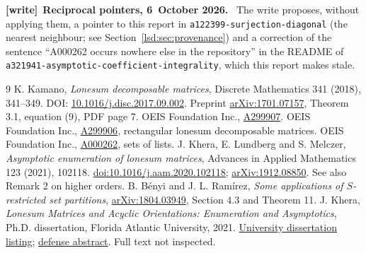\documentclass[11pt]{article}
\theoremstyle{remark}\newtheorem{remark}{Remark}
\newcommand{\file}[1]{\nolinkurl{#1}}
\newenvironment{writenote}[1][]{\par\smallskip\begingroup\small
 \noindent\textbf{[write]}\if\relax\detokenize{#1}\relax\else~\textbf{#1.}\fi\ }%
 {\par\endgroup\smallskip}
\begin{document}
\begin{writenote}[Reciprocal pointers, 6~October 2026]
The write proposes, without applying them, a pointer to this report in
\file{a122399-surjection-diagonal} (the nearest neighbour; see
Section~\ref{lsd:sec:provenance}) and a correction of the sentence ``A000262
occurs nowhere else in the repository'' in the README of
\file{a321941-asymptotic-coefficient-integrality}, which this report makes
stale.
\end{writenote}

\begin{thebibliography}{9}
 K. Kamano, \emph{Lonesum decomposable matrices}, Discrete Mathematics 341 (2018), 341--349. DOI: \href{https://doi.org/10.1016/j.disc.2017.09.002}{10.1016/j.disc.2017.09.002}. Preprint \href{https://arxiv.org/abs/1701.07157}{arXiv:1701.07157}, Theorem 3.1, equation (9), PDF page 7.
 OEIS Foundation Inc., \href{https://oeis.org/A299907}{A299907}.
 OEIS Foundation Inc., \href{https://oeis.org/A299906}{A299906}, rectangular lonesum decomposable matrices.
 OEIS Foundation Inc., \href{https://oeis.org/A000262}{A000262}, sets of lists.
 J. Khera, E. Lundberg and S. Melczer, \emph{Asymptotic enumeration of lonesum matrices}, Advances in Applied Mathematics 123 (2021), 102118. \href{https://doi.org/10.1016/j.aam.2020.102118}{doi:10.1016/j.aam.2020.102118}; \href{https://arxiv.org/abs/1912.08850}{arXiv:1912.08850}. See also Remark 2 on higher orders.
 B. B\'enyi and J. L. Ram\'irez, \emph{Some applications of $S$-restricted set partitions}, \href{https://arxiv.org/abs/1804.03949}{arXiv:1804.03949}, Section 4.3 and Theorem 11.
 J. Khera, \emph{Lonesum Matrices and Acyclic Orientations: Enumeration and Asymptotics}, Ph.D. dissertation, Florida Atlantic University, 2021. \href{https://www.math.fau.edu/mathdepartment/dissertations/dissertations.php}{University dissertation listing}; \href{https://www.math.fau.edu/mathdepartment/dissertaion-defense-anouncement-jessica-khera031121.pdf}{defense abstract}. Full text not inspected.
\end{thebibliography}
\end{document}
